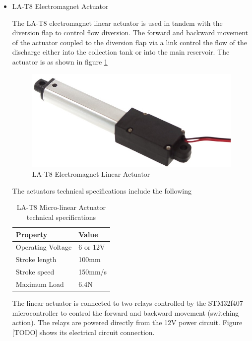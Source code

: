 \begin{itemize}
    \item LA-T8 Electromagnet Actuator
\par
The LA-T8 electromagnet linear actuator is used in tandem with the diversion flap to control flow diversion. The forward and backward movement of the actuator coupled to the diversion flap via a link control the flow of the discharge either into the collection tank or into the main reservoir. The actuator is as shown in figure \ref{fig: LA-T8 Electromagnet Linear Actuator}
\begin{figure}[H]
        \centering
        \includegraphics [height=.3\textheight] {Figures/LA-T8.jpg}
        \caption{LA-T8 Electromagnet Linear Actuator}
        \label{fig: LA-T8 Electromagnet Linear Actuator}
        \end{figure}
\par
The actuators technical specifications include the following
\begin{table}[H]
    \centering
    \caption[LA-T8 Micro-linear Actuator technical specifications]{LA-T8 Micro-linear Actuator technical specifications}
    \begin{tabular}{|l|l|}
    \hline
    \textbf{Property} & \textbf{Value} \\ \hline
    Operating Voltage & 6 or 12V \\ \hline
    Stroke length & 100mm \\ \hline
    Stroke speed & 150mm/s \\ \hline
    Maximum Load & 6.4N \\ \hline
    \end{tabular}
    \label{tab:LA-T8 Micro-linear Actuator technical specifications]}
    \end{table}
\par
The linear actuator is connected to two relays controlled by the STM32f407 microcontroller to control the forward and backward movement (switching action). The relays are powered directly from the 12V power circuit. Figure [TODO] shows its electrical circuit connection.
\end{itemize}
        







